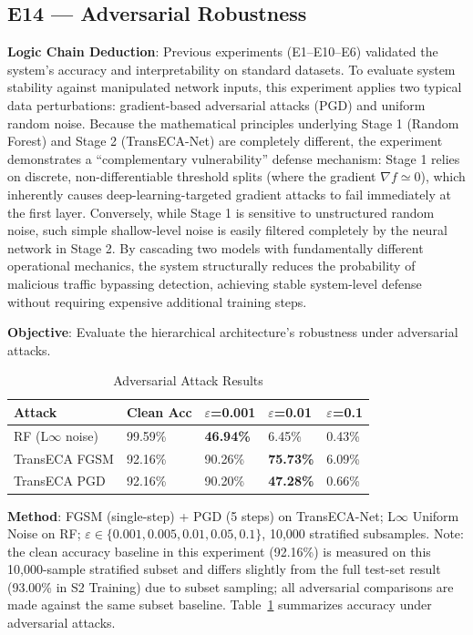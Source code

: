 \documentclass[sigconf]{acmart}
\begin{document}
\subsection{E14 --- Adversarial Robustness}
\textbf{Logic Chain Deduction}: Previous experiments (E1--E10--E6) validated the system's accuracy and interpretability on standard datasets. To evaluate system stability against manipulated network inputs, this experiment applies two typical data perturbations: gradient-based adversarial attacks (PGD) and uniform random noise. Because the mathematical principles underlying Stage 1 (Random Forest) and Stage 2 (TransECA-Net) are completely different, the experiment demonstrates a ``complementary vulnerability'' defense mechanism: Stage 1 relies on discrete, non-differentiable threshold splits (where the gradient $\nabla f \simeq 0$), which inherently causes deep-learning-targeted gradient attacks to fail immediately at the first layer. Conversely, while Stage 1 is sensitive to unstructured random noise, such simple shallow-level noise is easily filtered completely by the neural network in Stage 2. By cascading two models with fundamentally different operational mechanics, the system structurally reduces the probability of malicious traffic bypassing detection, achieving stable system-level defense without requiring expensive additional training steps.

\textbf{Objective}: Evaluate the hierarchical architecture's robustness under adversarial attacks.


\begin{table}[!t]
\caption{Adversarial Attack Results}
\label{tab:adversarial}
\begin{tabular}{lllll}
\toprule
\textbf{Attack} & \textbf{Clean Acc} & \textbf{$\varepsilon$=0.001} & \textbf{$\varepsilon$=0.01} & \textbf{$\varepsilon$=0.1} \\
\midrule
RF (L$\infty$ noise) & 99.59\% & \textbf{46.94\%} & 6.45\% & 0.43\% \\
TransECA FGSM & 92.16\% & 90.26\% & \textbf{75.73\%} & 6.09\% \\
TransECA PGD & 92.16\% & 90.20\% & \textbf{47.28\%} & 0.66\% \\
\bottomrule
\end{tabular}
\end{table}

\textbf{Method}: FGSM \cite{24} (single-step) + PGD \cite{13} (5 steps) on TransECA-Net; L$\infty$ Uniform Noise on RF; $\varepsilon \in \{0.001, 0.005, 0.01, 0.05, 0.1\}$, 10,000 stratified subsamples. Note: the clean accuracy baseline in this experiment (92.16\%) is measured on this 10,000-sample stratified subset and differs slightly from the full test-set result (93.00\% in S2 Training) due to subset sampling; all adversarial comparisons are made against the same subset baseline. Table~\ref{tab:adversarial} summarizes accuracy under adversarial attacks.
\end{document}
